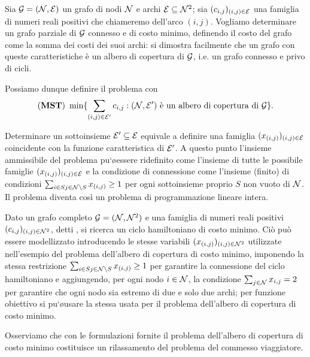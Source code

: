 \begin{Example}
	 Sia $\mathcal{G} = (\mathcal{N}, \mathcal{E})$ un grafo di nodi $\mathcal{N}$ e archi $\mathcal{E} \subseteq \mathcal{N}^2$; sia $(c_{i,j})_{(i,j) \in \mathcal{E}}$ una famiglia di numeri reali positivi che chiameremo  dell'arco $(i,j)$. Vogliamo determinare un grafo parziale di $\mathcal{G}$ connesso e di costo minimo, definendo il costo del grafo come la somma dei costi dei suoi archi: si dimostra facilmente che un grafo con queste caratteristiche \`e un albero di copertura di $\mathcal{G}$, i.e. un grafo connesso e privo di cicli.
	\par Possiamo dunque definire il problema con
	$$(\textbf{MST})\ \min \lbrace \sum_{(i,j) \in \mathcal{E}'} c_{i,j} : (\mathcal{N},\mathcal{E}')\text{ \`e un albero di copertura di }\mathcal{G} \rbrace.$$
	\par Determinare un sottoinsieme $\mathcal{E}' \subseteq \mathcal{E}$ equivale a definire una famiglia $(x_{(i,j)})_{(i,j) \in \mathcal{E}}$ coincidente con la funzione caratteristica di $\mathcal{E}'$. A questo punto l'insieme ammissibile del problema pu`\o essere ridefinito come l'insieme di tutte le possibile famiglie $(x_{(i,j)})_{(i,j) \in \mathcal{E}}$ e la condizione di connessione come l'insieme (finito) di condizioni $\sum_{i \in S\\j \in \mathcal{N} \setminus S} x_{(i,j)} \geq 1$ per ogni sottoinsieme proprio $S$ non vuoto di $\mathcal{N}$. Il problema diventa cos\`i un problema di programmazione lineare intera.
\end{Example}
\begin{Example}
	Dato un grafo completo $\mathcal{G} = (\mathcal{N}, \mathcal{N}^2)$ e una famiglia di numeri reali positivi $(c_{i,j})_{(i,j) \in \mathcal{N}^2}$, detti , si ricerca un ciclo hamiltoniano di costo minimo. Ci\`o pu\`o essere modellizzato introducendo le stesse variabili $(x_{(i,j)})_{(i,j) \in \mathcal{N}^2}$ utilizzate nell'esempio del problema dell'albero di copertura di costo minimo, imponendo la stessa restrizione $\sum_{i \in S\\j \in \mathcal{N} \setminus S} x_{(i,j)} \geq 1$ per garantire la connessione del ciclo hamiltoniano e aggiungendo, per ogni nodo $i \in \mathcal{N}$, la condizione $\sum_{j \in \mathcal{N}} x_{i,j} = 2$ per garantire che ogni nodo sia estremo di due e solo due archi; per funzione obiettivo si pu`\o usare la stessa usata per il problema dell'albero di copertura di costo minimo.
	\par Osserviamo che con le formulazioni fornite il problema dell'albero di copertura di costo minimo costituisce un rilassamento del problema del commesso viaggiatore.
\end{Example}
